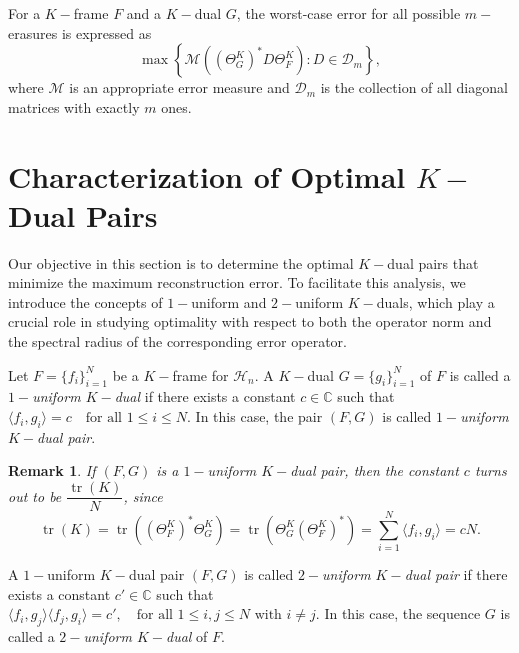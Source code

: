 \documentclass[final,1p,times]{elsarticle}
\newtheorem{rem}[thm]{Remark}
\begin{document}
For a \( K-\)frame \( F \) and a \( K -\)dual \( G \), the worst-case error for all possible \( m-\)erasures is expressed as
\[ \max \left\{ \mathcal{M}\left((\Theta_G^K)^* D \Theta_F^K\right) : D \in \mathcal{D}_m \right\}, \]
where \( \mathcal{M} \) is an appropriate error measure and \( \mathcal{D}_m \) is the collection of all diagonal matrices with exactly \( m \) ones.



   
    
    
    
    
    
    
    
    
    
    
    \section{Characterization of Optimal $K-$Dual Pairs}
    
Our objective in this section is to determine the optimal \( K-\)dual pairs that minimize the maximum reconstruction error. To facilitate this analysis, we introduce the concepts of \(1-\)uniform and \(2-\)uniform \(K-\)duals, which play a crucial role in studying optimality with respect to both the operator norm and the spectral radius of the corresponding error operator.


\begin{defn}\label{defn3point1}
Let \( F = \{f_i\}_{i=1}^N \) be a \( K-\)frame for \( \mathcal{H}_n \). A \( K-\)dual \( G = \{g_i\}_{i=1}^N \) of \( F \) is called a \emph{$1-$uniform \( K-\)dual} if there exists a constant \( c \in \mathbb{C} \) such that $\langle f_i, g_i \rangle = c \quad \text{for all } 1 \leq i \leq N.$ In this case, the pair \( (F, G) \) is called \emph{$1-$uniform \( K-\)dual pair}.
\end{defn}

\begin{rem}\label{rem3point2}
If $(F,G)$ is a $1-$uniform $K-$dual pair, then the constant  \( c  \) turns out to be \(\dfrac{\operatorname{tr}(K)}{N}\), since
\[
\operatorname{tr}(K) = \operatorname{tr}\left( (\Theta_F^K)^* \Theta_G^K \right) = \operatorname{tr}\left( \Theta_G^K (\Theta_F^K)^* \right) = \sum_{i=1}^N \langle f_i, g_i \rangle = cN.
\]
\end{rem}

\begin{defn}
 A $1-$uniform \( K-\)dual pair \( (F, G) \) is called \emph{$2-$uniform \( K -\)dual pair} if there exists a constant \( c' \in \mathbb{C} \) such that $\langle f_i, g_j \rangle \langle f_j, g_i \rangle = c', \quad \text{for all } 1 \leq i, j \leq N \text{ with } i \neq j.$ In this case, the sequence \( G \) is called a \emph{$2-$uniform \( K -\)dual} of \( F \).
\end{defn}
\end{document}
